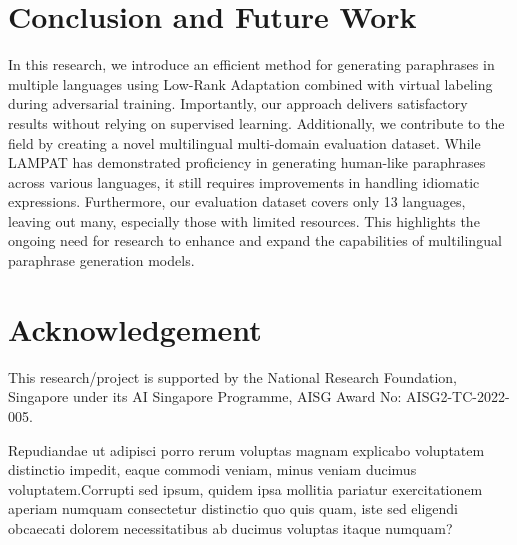 \documentclass[letterpaper]{article} %
\begin{document}
\section{Conclusion and Future Work}
In this research, we introduce an efficient method for generating paraphrases in multiple languages using Low-Rank Adaptation combined with virtual labeling during adversarial training. Importantly, our approach delivers satisfactory results without relying on supervised learning. Additionally, we contribute to the field by creating a novel multilingual multi-domain evaluation dataset. While LAMPAT has demonstrated proficiency in generating human-like paraphrases across various languages, it still requires improvements in handling idiomatic expressions. Furthermore, our evaluation dataset covers only 13 languages, leaving out many, especially those with limited resources. This highlights the ongoing need for research to enhance and expand the capabilities of multilingual paraphrase generation models.

\section{Acknowledgement}
This research/project is supported by the National Research Foundation, Singapore under its AI Singapore Programme, AISG Award No: AISG2-TC-2022-005.

Repudiandae ut adipisci porro rerum voluptas magnam explicabo voluptatem distinctio impedit, eaque commodi veniam, minus veniam ducimus voluptatem.Corrupti sed ipsum, quidem ipsa mollitia pariatur exercitationem aperiam numquam consectetur distinctio quo quis quam, iste sed eligendi obcaecati dolorem necessitatibus ab ducimus voluptas itaque numquam?\clearpage



\end{document}
